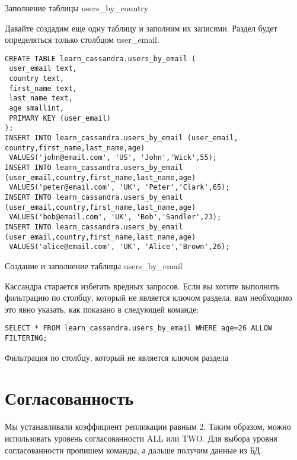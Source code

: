 \begin{image}
	\caption{Заполнение таблицы users\_by\_country}
	\label{fig:insert:users-by-country}
\end{image}

Давайте создадим еще одну таблицу и заполним их записями.
Раздел будет определяться только столбцом user\_email.

\begin{verbatim}
CREATE TABLE learn_cassandra.users_by_email (
 user_email text,
 country text,
 first_name text,
 last_name text,
 age smallint,
 PRIMARY KEY (user_email)
);
INSERT INTO learn_cassandra.users_by_email (user_email,
country,first_name,last_name,age)
 VALUES('john@email.com', 'US', 'John','Wick',55);
INSERT INTO learn_cassandra.users_by_email
(user_email,country,first_name,last_name,age)
 VALUES('peter@email.com', 'UK', 'Peter','Clark',65);
INSERT INTO learn_cassandra.users_by_email
(user_email,country,first_name,last_name,age)
 VALUES('bob@email.com', 'UK', 'Bob','Sandler',23);
INSERT INTO learn_cassandra.users_by_email
(user_email,country,first_name,last_name,age)
 VALUES('alice@email.com', 'UK', 'Alice','Brown',26);
\end{verbatim}

\begin{image}
	\caption{Создание и заполнение таблицы users\_by\_email}
	\label{fig:table:users-by-email}
\end{image}

Кассандра старается избегать вредных запросов.
Если вы хотите выполнить фильтрацию по столбцу,
который не является ключом раздела, вам необходимо это явно указать,
как показано в следующей команде:

\begin{verbatim}
SELECT * FROM learn_cassandra.users_by_email WHERE age=26 ALLOW FILTERING;
\end{verbatim}

\begin{image}
	\caption{Фильтрация по столбцу, который не является ключом раздела}
	\label{fig:filter:not-key}
\end{image}

\section{Согласованность}

Мы устанавливали коэффициент репликации равным 2.
Таким образом, можно использовать уровень согласованности ALL или TWO.
Для выбора уровня согласованности пропишем команды,
а дальше получим данные из БД.

